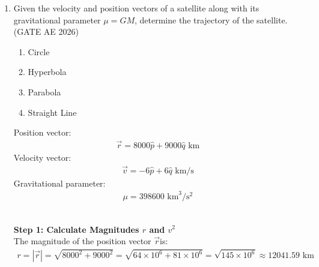 \begin{enumerate}
\noindent \textbf {Submatrix Comparison for Entry $a_{12}$}\\

When selecting $a_{12}$:
\begin{itemize}
    \item In $\mathbf{A}$ (Row 1, Column 2 deletion):
    \begin{align}
    \mathbf{M_{12}} = \myvec{ a_{21} & a_{23} \\ a_{31} & a_{33} }
    \end{align}

    \item In $\mathbf{A^T}$ (Row 2, Column 1 deletion):
    \begin{align}
    \mathbf{N_{21}} = \myvec{ a_{21} & a_{31} \\ a_{23} & a_{33} }
    \end{align}
\end{itemize}

\noindent Notice that $\mathbf{N_{21}} = \brak{\mathbf{M_{12}}}^T$. Since $\mydet{\mathbf{M_{12}}} = \mydet{\brak{\mathbf{M_{12}}}^T}$, every term in the expansion of $\mydet{\mathbf{A}}$ is identically equal to the corresponding term in $\mydet{\mathbf{A^T}}$.
\newpage

\item
	
Given the velocity and position vectors of a satellite along with its gravitational parameter $\mu=GM$, determine the trajectory of the satellite. \hfill (GATE AE 2026) 
\begin{enumerate}
    \item Circle
    \item Hyperbola
    \item Parabola
    \item Straight Line
\end{enumerate} 

    \noindent Position vector: 
    \begin{align}
    \vec{r} = 8000\hat{p} + 9000\hat{q} \text{ km}
    \end{align}
    \noindent Velocity vector:
    \begin{align}
    \vec{v} = -6\hat{p} + 6\hat{q} \text{ km/s}
    \end{align}
    \noindent Gravitational parameter: 
    \begin{align}
    \mu = 398600 \text{ km}^3/\text{s}^2
    \end{align}

\solution \\ 
\noindent \textbf{Step 1: Calculate Magnitudes $r$ and $v^2$}\\
The magnitude of the position vector $\vec{r}$is:
\begin{align}
r = |\vec{r}| = \sqrt{8000^2 + 9000^2} = \sqrt{64 \times 10^6 + 81 \times 10^6} = \sqrt{145 \times 10^6} \approx 12041.59 \text{ km}
\end{align}


\end{enumerate}
